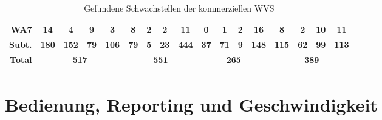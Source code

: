 \documentclass[12pt,oneside,a4paper,parskip]{scrbook}
\begin{document}
\begin{table}[H]
\begin{tabular}{|r|c|c|c|c|c|c|c|c|c|c|c|c|c|c|c|c|}
        \hline
        \textbf{WA7} & 14           & 4            & 9           & 3            & 8           & 2          & 2           & 11           & 0           & 1           & 2          & 16           & 8            & 2           & 10          & 11            \\
        \hline
        \textbf{Subt.}        & \textbf{180} & \textbf{152} & \textbf{79} & \textbf{106} & \textbf{79} & \textbf{5} & \textbf{23} & \textbf{444} & \textbf{37} & \textbf{71} & \textbf{9} & \textbf{148} & \textbf{115} & \textbf{62} & \textbf{99} & \textbf{113}  \\
        \hline
        \textbf{Total}           & \multicolumn{4}{c|}{\textbf{517}}                        & \multicolumn{4}{c|}{\textbf{551}}                     & \multicolumn{4}{c|}{\textbf{265}}                     & \multicolumn{4}{c|}{\textbf{389}}                        \\
        \hline
      \end{tabular}
      \caption[Gefundene Schwachstellen der kommerziellen WVS]{Gefundene Schwachstellen der kommerziellen WVS}
    \end{table}

  \section{Bedienung, Reporting und Geschwindigkeit}
\end{document}
